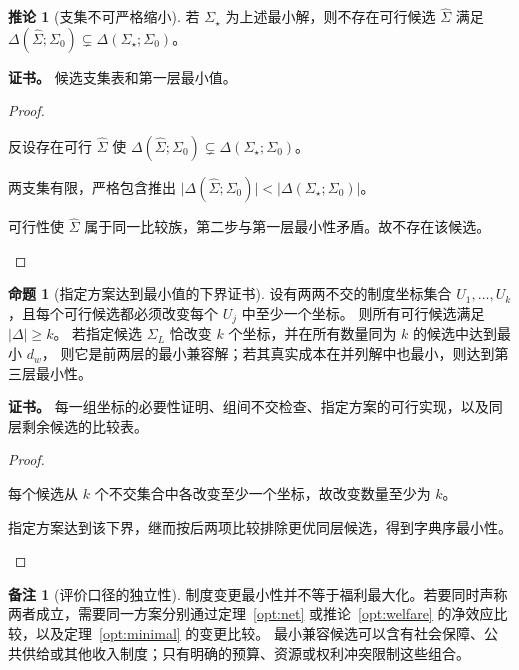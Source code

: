 \documentclass[UTF8,12pt,a4paper,openany,fontset=none,zihao=false]{ctexrep}
\theoremstyle{definition}
\newtheorem{proposition}{命题}[chapter]
\newtheorem{corollary}{推论}[chapter]
\newtheorem{remark}{备注}[chapter]
\newenvironment{certificate}{\par\noindent\textbf{证书。}\ignorespaces}{\par}
\newcommand{\1}{\mathbf 1}
\begin{document}
\begin{corollary}[支集不可严格缩小]
若 \(\Sigma_\star\) 为上述最小解，则不存在可行候选 \(\widehat\Sigma\) 满足
\(\Delta(\widehat\Sigma;\Sigma_0)\subsetneq\Delta(\Sigma_\star;\Sigma_0)\)。
\end{corollary}
\begin{certificate}
候选支集表和第一层最小值。
\end{certificate}
\begin{proof}
\begin{semanticsteps}
\item 反设存在可行 \(\widehat\Sigma\) 使
\(\Delta(\widehat\Sigma;\Sigma_0)\subsetneq\Delta(\Sigma_\star;\Sigma_0)\)。
\item 两支集有限，严格包含推出
\(\lvert\Delta(\widehat\Sigma;\Sigma_0)\rvert<\lvert\Delta(\Sigma_\star;\Sigma_0)\rvert\)。
\item 可行性使 \(\widehat\Sigma\) 属于同一比较族，第二步与第一层最小性矛盾。故不存在该候选。
\end{semanticsteps}
\end{proof}

\begin{proposition}[指定方案达到最小值的下界证书]
\label{opt:lowerbound}
设有两两不交的制度坐标集合 \(U_1,\ldots,U_k\)，且每个可行候选都必须改变每个 \(U_j\) 中至少一个坐标。
则所有可行候选满足 \(\lvert\Delta\rvert\ge k\)。
若指定候选 \(\Sigma_L\) 恰改变 \(k\) 个坐标，并在所有数量同为 \(k\) 的候选中达到最小 \(d_w\)，
则它是前两层的最小兼容解；若其真实成本在并列解中也最小，则达到第三层最小性。
\end{proposition}
\begin{certificate}
每一组坐标的必要性证明、组间不交检查、指定方案的可行实现，以及同层剩余候选的比较表。
\end{certificate}
\begin{proof}
\begin{semanticsteps}
\item 每个候选从 \(k\) 个不交集合中各改变至少一个坐标，故改变数量至少为 \(k\)。
\item 指定方案达到该下界，继而按后两项比较排除更优同层候选，得到字典序最小性。
\end{semanticsteps}
\end{proof}

\begin{remark}[评价口径的独立性]
制度变更最小性并不等于福利最大化。若要同时声称两者成立，需要同一方案分别通过定理~\ref{opt:net}
或推论~\ref{opt:welfare} 的净效应比较，以及定理~\ref{opt:minimal} 的变更比较。
最小兼容候选可以含有社会保障、公共供给或其他收入制度；只有明确的预算、资源或权利冲突限制这些组合。
\end{remark}
\end{document}
